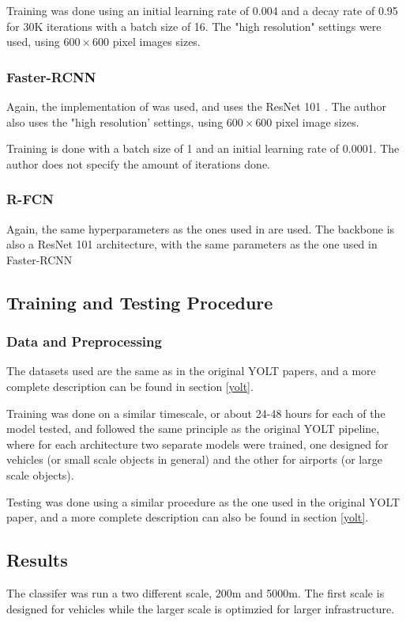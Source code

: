 Training was done using an initial learning rate of 0.004 and a decay rate of 0.95 for 30K iterations with a batch size of 16. The "high resolution" settings were used, using $600 \times 600$ pixel images sizes.

\subsubsection{Faster-RCNN}
Again, the implementation of \cite{huangAlObjDetectors} was used, and uses the ResNet 101 \cite{resNet}. The author also uses the "high resolution' settings, using $600 \times 600$ pixel image sizes. 

Training is done with a batch size of 1 and an initial learning rate of 0.0001. The author does not specify the amount of iterations done.
\subsubsection{R-FCN}
Again, the same hyperparameters as the ones used in \cite{huangAlObjDetectors} are used. The backbone is also a ResNet 101 architecture, with the same parameters as the one used in Faster-RCNN

\subsection{Training and Testing Procedure}
\subsubsection{Data and Preprocessing}
The datasets used are the same as in the original YOLT papers, and a more complete description can be found in section \ref{yolt}.

Training was done on a similar timescale, or about 24-48 hours for each of the model tested, and followed the same principle as the original YOLT pipeline, where for each architecture two separate models were trained, one designed for vehicles (or small scale objects in general) and the other for airports (or large scale objects).

Testing was done using a similar procedure as the one used in the original YOLT paper, and a more complete description can also be found in section \ref{yolt}.

\subsection{Results}
The classifer was run a two different scale, 200m and 5000m. The first scale is designed for vehicles while the larger scale is optimzied for larger infrastructure. 


